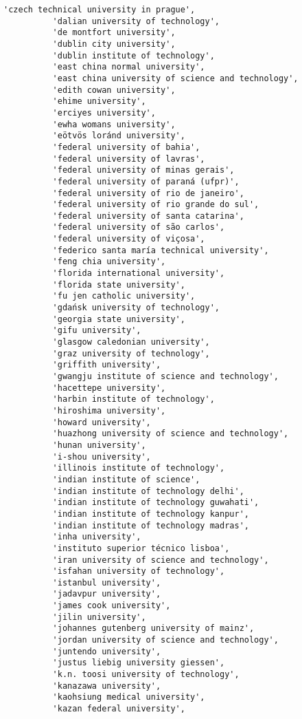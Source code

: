 \documentclass[11pt]{article}
\begin{document}
\begin{Verbatim}[commandchars=\\\{\}]
          'czech technical university in prague',
          'dalian university of technology',
          'de montfort university',
          'dublin city university',
          'dublin institute of technology',
          'east china normal university',
          'east china university of science and technology',
          'edith cowan university',
          'ehime university',
          'erciyes university',
          'ewha womans university',
          'eötvös loránd university',
          'federal university of bahia',
          'federal university of lavras',
          'federal university of minas gerais',
          'federal university of paraná (ufpr)',
          'federal university of rio de janeiro',
          'federal university of rio grande do sul',
          'federal university of santa catarina',
          'federal university of são carlos',
          'federal university of viçosa',
          'federico santa maría technical university',
          'feng chia university',
          'florida international university',
          'florida state university',
          'fu jen catholic university',
          'gdańsk university of technology',
          'georgia state university',
          'gifu university',
          'glasgow caledonian university',
          'graz university of technology',
          'griffith university',
          'gwangju institute of science and technology',
          'hacettepe university',
          'harbin institute of technology',
          'hiroshima university',
          'howard university',
          'huazhong university of science and technology',
          'hunan university',
          'i-shou university',
          'illinois institute of technology',
          'indian institute of science',
          'indian institute of technology delhi',
          'indian institute of technology guwahati',
          'indian institute of technology kanpur',
          'indian institute of technology madras',
          'inha university',
          'instituto superior técnico lisboa',
          'iran university of science and technology',
          'isfahan university of technology',
          'istanbul university',
          'jadavpur university',
          'james cook university',
          'jilin university',
          'johannes gutenberg university of mainz',
          'jordan university of science and technology',
          'juntendo university',
          'justus liebig university giessen',
          'k.n. toosi university of technology',
          'kanazawa university',
          'kaohsiung medical university',
          'kazan federal university',

\end{Verbatim}
\end{document}

